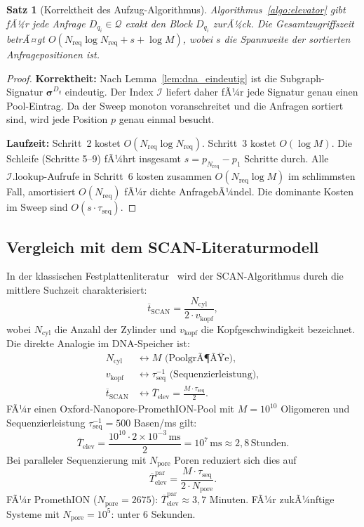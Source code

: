 ﻿\documentclass[a4paper,12pt]{article}
\theoremstyle{definition}
\theoremstyle{plain}
\newtheorem{satz}{Satz}[section]
\begin{document}
\begin{satz}[Korrektheit des Aufzug-Algorithmus]
\label{satz:elevator_korrektheit}
  Algorithmus~\ref{algo:elevator} gibt fÃ¼r jede Anfrage $D_{q_i} \in \mathcal{Q}$
  exakt den Block $D_{q_i}$ zurÃ¼ck.  Die Gesamtzugriffszeit betrÃ¤gt
  $O(N_{\mathrm{req}} \log N_{\mathrm{req}} + s + \log M)$, wobei
  $s$ die Spannweite der sortierten Anfragepositionen ist.
\end{satz}

\begin{proof}
  \textbf{Korrektheit:} Nach Lemma~\ref{lem:dna_eindeutig} ist die
  Subgraph-Signatur $\boldsymbol{\sigma}^{D_q}$ eindeutig.  Der Index
  $\mathcal{I}$ liefert daher fÃ¼r jede Signatur genau einen Pool-Eintrag.
  Da der Sweep monoton voranschreitet und die Anfragen sortiert sind,
  wird jede Position $p$ genau einmal besucht.

  \textbf{Laufzeit:} Schritt~2 kostet $O(N_{\mathrm{req}} \log N_{\mathrm{req}})$.
  Schritt~3 kostet $O(\log M)$.  Die Schleife (Schritte 5--9) fÃ¼hrt
  insgesamt $s = p_{N_{\mathrm{req}}} - p_1$ Schritte durch.  Alle
  $\mathcal{I}.\mathrm{lookup}$-Aufrufe in Schritt~6 kosten zusammen
  $O(N_{\mathrm{req}} \log M)$ im schlimmsten Fall, amortisiert
  $O(N_{\mathrm{req}})$ fÃ¼r dichte AnfragebÃ¼ndel.  Die dominante Kosten
  im Sweep sind $O(s \cdot \tau_{\mathrm{seq}})$. 
\end{proof}

\subsection{Vergleich mit dem SCAN-Literaturmodell}
\label{ssec:elevator_scan}

In der klassischen Festplattenliteratur~\cite{tanenbaum} wird der
SCAN-Algorithmus durch die mittlere Suchzeit charakterisiert:
\[
  \overline{t}_{\mathrm{SCAN}} = \frac{N_{\mathrm{cyl}}}{2 \cdot v_{\mathrm{kopf}}},
\]
wobei $N_{\mathrm{cyl}}$ die Anzahl der Zylinder und $v_{\mathrm{kopf}}$
die Kopfgeschwindigkeit bezeichnet.  Die direkte Analogie im DNA-Speicher
ist:
\begin{align*}
  N_{\mathrm{cyl}}   &\leftrightarrow M \text{ (PoolgrÃ¶ÃŸe)}, \\
  v_{\mathrm{kopf}}  &\leftrightarrow \tau_{\mathrm{seq}}^{-1}
                                      \text{ (Sequenzierleistung)}, \\
  \overline{t}_{\mathrm{SCAN}}
    &\leftrightarrow \overline{T}_{\mathrm{elev}}
      = \frac{M \cdot \tau_{\mathrm{seq}}}{2}.
\end{align*}
FÃ¼r einen Oxford-Nanopore-PromethION-Pool mit
$M = 10^{10}$ Oligomeren und Sequenzierleistung
$\tau_{\mathrm{seq}}^{-1} = 500$ Basen/ms gilt:
\[
  \overline{T}_{\mathrm{elev}}
  = \frac{10^{10} \cdot 2 \times 10^{-3}\,\text{ms}}{2}
  = 10^7\,\text{ms}
  \approx 2{,}8\,\text{Stunden}.
\]
Bei paralleler Sequenzierung mit $N_{\mathrm{pore}}$ Poren reduziert
sich dies auf
\[
  \overline{T}_{\mathrm{elev}}^{\mathrm{par}} = \frac{M \cdot \tau_{\mathrm{seq}}}{2 \cdot N_{\mathrm{pore}}}.
\]
FÃ¼r PromethION ($N_{\mathrm{pore}} = 2675$):
$\overline{T}_{\mathrm{elev}}^{\mathrm{par}} \approx 3{,}7$ Minuten.
FÃ¼r zukÃ¼nftige Systeme mit $N_{\mathrm{pore}} = 10^5$: unter $6$ Sekunden.
\end{document}

